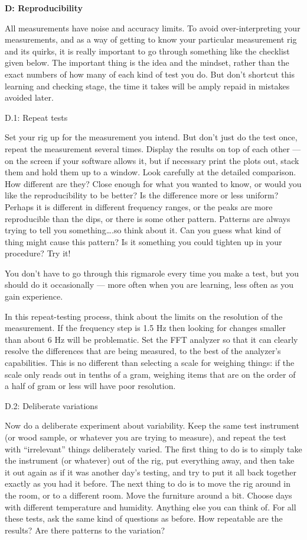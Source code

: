   \textbf{D: Reproducibility} 

  All measurements have noise and accuracy limits. To avoid over-interpreting 
  your measurements, and as a way of getting to know your particular 
  measurement rig and its quirks, it is really important to go through 
  something like the checklist given below. The important thing is the idea and 
  the mindset, rather than the exact numbers of how many of each kind of test 
  you do. But don’t shortcut this learning and checking stage, the time it 
  takes will be amply repaid in mistakes avoided later. 

  D.1: Repeat tests 

  Set your rig up for the measurement you intend. But don’t just do the test 
  once, repeat the measurement several times. Display the results on top of 
  each other — on the screen if your software allows it, but if necessary print 
  the plots out, stack them and hold them up to a window. Look carefully at the 
  detailed comparison. How different are they? Close enough for what you wanted 
  to know, or would you like the reproducibility to be better? Is the 
  difference more or less uniform? Perhaps it is different in different 
  frequency ranges, or the peaks are more reproducible than the dips, or there 
  is some other pattern. Patterns are always trying to tell you something….so 
  think about it. Can you guess what kind of thing might cause this pattern? Is 
  it something you could tighten up in your procedure? Try it! 

  You don’t have to go through this rigmarole every time you make a test, but 
  you should do it occasionally — more often when you are learning, less often 
  as you gain experience. 

  In this repeat-testing process, think about the limits on the resolution of 
  the measurement. If the frequency step is 1.5 Hz then looking for changes 
  smaller than about 6 Hz will be problematic. Set the FFT analyzer so that it 
  can clearly resolve the differences that are being measured, to the best of 
  the analyzer’s capabilities. This is no different than selecting a scale for 
  weighing things: if the scale only reads out in tenths of a gram, weighing 
  items that are on the order of a half of gram or less will have poor 
  resolution. 

  D.2: Deliberate variations 

  Now do a deliberate experiment about variability. Keep the same test 
  instrument (or wood sample, or whatever you are trying to measure), and 
  repeat the test with “irrelevant” things deliberately varied. The first thing 
  to do is to simply take the instrument (or whatever) out of the rig, put 
  everything away, and then take it out again as if it was another day’s 
  testing, and try to put it all back together exactly as you had it before. 
  The next thing to do is to move the rig around in the room, or to a different 
  room. Move the furniture around a bit. Choose days with different temperature 
  and humidity. Anything else you can think of. For all these tests, ask the 
  same kind of questions as before. How repeatable are the results? Are there 
  patterns to the variation? 

